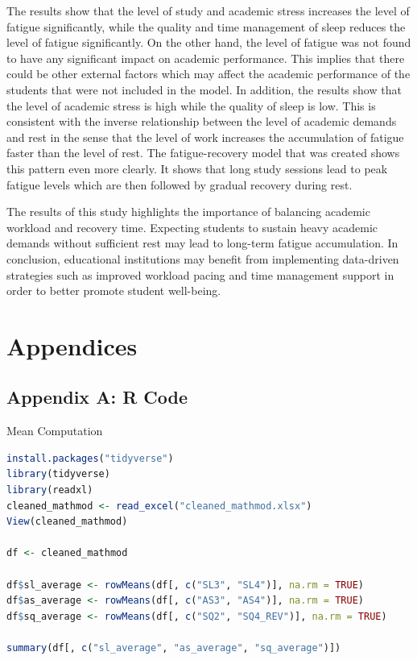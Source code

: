 \documentclass [12pt]{article}
\begin{document}
The results show that the level of study and academic stress increases the level of fatigue significantly, while the quality and time management of sleep reduces the level of fatigue significantly. On the other hand, the level of fatigue was not found to have any significant impact on academic performance. This implies that there could be other external factors which may affect the academic performance of the students that were not included in the model. In addition, the results show that the level of academic stress is high while the quality of sleep is low. This is consistent with the inverse relationship between the level of academic demands and rest in the sense that the level of work increases the accumulation of fatigue faster than the level of rest. The fatigue-recovery model that was created shows this pattern even more clearly. It shows that long study sessions lead to peak fatigue levels which are then followed by gradual recovery during rest.

The results of this study highlights the importance of balancing academic workload and recovery time. Expecting students to sustain heavy academic demands without sufficient rest may lead to long-term fatigue accumulation. In conclusion, educational institutions may benefit from implementing data-driven strategies such as improved workload pacing and time management support in order to better promote student well-being.

\newpage
\printbibliography


\newpage 
\section*{Appendices}

\subsection*{Appendix A: R Code}
Mean Computation
\begin{lstlisting}[language=R]
install.packages("tidyverse")
library(tidyverse)
library(readxl)
cleaned_mathmod <- read_excel("cleaned_mathmod.xlsx")
View(cleaned_mathmod)

df <- cleaned_mathmod

df$sl_average <- rowMeans(df[, c("SL3", "SL4")], na.rm = TRUE)
df$as_average <- rowMeans(df[, c("AS3", "AS4")], na.rm = TRUE)
df$sq_average <- rowMeans(df[, c("SQ2", "SQ4_REV")], na.rm = TRUE)

summary(df[, c("sl_average", "as_average", "sq_average")])
\end{lstlisting}
\end{document}
